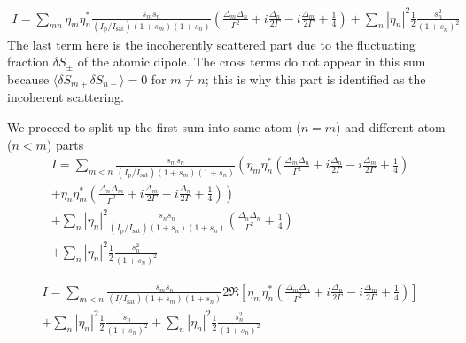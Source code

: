 \documentclass[11pt,letter]{article}
\newcommand{\iisat}{\ensuremath{I_{\mathrm{p}}/I_{\mathrm{sat}}}}
\begin{document}
\begin{multline}
 I  = 
  \sum_{mn}  \eta_{m}\eta_{n}^{*}
    \frac{ s_{m} s_{n} } { (\iisat) ( 1+s_{m} )( 1+s_{n} ) }
    \left(
        \frac{ \Delta_{m} \Delta_{n} }{ \Gamma^{2} } 
      + i \frac{ \Delta_{n} }{ 2 \Gamma } 
      - i \frac{ \Delta_{m} }{ 2 \Gamma } 
      + \frac{1}{4}  
    \right)  
   + \sum_{n} | \eta_{n}|^{2} \frac{1}{2} \frac{ s_{n}^{2} } 
                                               { (1 + s _{n} )^{2} } 
\end{multline}
The last term here is the incoherently scattered part due to the fluctuating
fraction $\delta S_{\pm}$ of the atomic dipole.  The cross terms do not appear
in this sum because $\langle \delta S_{m+} \delta S_{n-}\rangle =0$ for $m\neq
n$;  this is why this part is identified as the incoherent scattering. 

We proceed to split up the first sum into same-atom ($n=m$) and different atom
($n<m$) parts 
\begin{multline}
 I  = 
  \sum_{m<n} 
    \frac{ s_{m} s_{n} } { (\iisat) ( 1+s_{m} )( 1+s_{n} ) }
    \left(
        \eta_{m}\eta_{n}^{*}
    \left(
        \frac{ \Delta_{m} \Delta_{n} }{ \Gamma^{2} } 
      + i \frac{ \Delta_{n} }{ 2 \Gamma } 
      - i \frac{ \Delta_{m} }{ 2 \Gamma } 
      + \frac{1}{4}  
    \right)  \right. \\
   \left.  + 
        \eta_{n}\eta_{m}^{*}
    \left(
        \frac{ \Delta_{n} \Delta_{m} }{ \Gamma^{2} } 
      + i \frac{ \Delta_{m} }{ 2 \Gamma } 
      - i \frac{ \Delta_{n} }{ 2 \Gamma } 
      + \frac{1}{4}  
    \right) 
    \right)  \\
  + \sum_{n}  |\eta_{n}|^{2}
    \frac{ s_{n} s_{n} } { (\iisat) ( 1+s_{n} )( 1+s_{n} ) }
    \left(
        \frac{ \Delta_{n} \Delta_{n} }{ \Gamma^{2} } 
      + \frac{1}{4}  
    \right) \\ 
   + \sum_{n} | \eta_{n}|^{2} \frac{1}{2} \frac{ s_{n}^{2} } 
                                               { (1 + s _{n} )^{2} } 
\end{multline}

\begin{multline}
 I  = 
  \sum_{m<n} 
    \frac{ s_{m} s_{n} } { (I/I_{\mathrm{sat}}) ( 1+s_{m} )( 1+s_{n} ) }
    2 \Re\left[ 
        \eta_{m}\eta_{n}^{*}
    \left(
        \frac{ \Delta_{m} \Delta_{n} }{ \Gamma^{2} } 
      + i \frac{ \Delta_{n} }{ 2 \Gamma } 
      - i \frac{ \Delta_{m} }{ 2 \Gamma } 
      + \frac{1}{4}  
    \right) \right] \\
  + \sum_{n}  |\eta_{n}|^{2}
    \frac{1}{2}	\frac{ s_{n} } { ( 1+s_{n} )^{2} }
   + \sum_{n} | \eta_{n}|^{2} \frac{1}{2} \frac{ s_{n}^{2} } 
                                               { (1 + s _{n} )^{2} } 
\end{multline}
\end{document}
